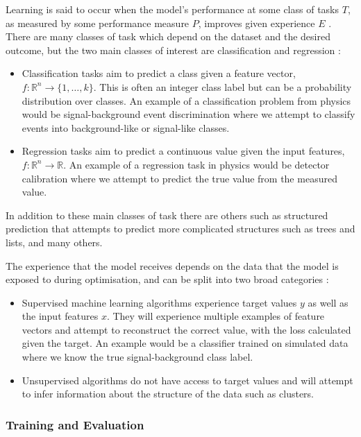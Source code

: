 Learning is said to occur when the model's performance at some class of tasks $T$, as measured by some performance measure $P$, improves given experience $E$ \cite{Learning}.
There are many classes of task which depend on the dataset and the desired outcome, but the two main classes of interest are classification and regression \cite{DeepLearningBook}:
\begin{itemize}[leftmargin=.5in,noitemsep]
    \item Classification tasks aim to predict a class given a feature vector, $f:\mathds{R}^{n}\rightarrow{}\{1,\dots,k\}$.
This is often an integer class label but can be a probability distribution over classes. An example of a classification problem from physics would be signal-background event discrimination where we attempt to classify events into background-like or signal-like classes.
    \item Regression tasks aim to predict a continuous value given the input features, $f:\mathds{R}^{n}\rightarrow\mathds{R}$. An example of a regression task in physics would be detector calibration where we attempt to predict the true value from the measured value. 
\end{itemize}
In addition to these main classes of task there are others such as structured prediction that attempts to predict more complicated structures such as trees and lists, and many others. 


The experience that the model receives depends on the data that the model is exposed to during optimisation, and can be split into two broad categories \cite{DeepLearningBook}:
\begin{itemize}[leftmargin=.5in,noitemsep]
    \item Supervised machine learning algorithms experience target values $y$ as well as the input features $x$. They will experience multiple examples of feature vectors and attempt to reconstruct the correct value, with the loss calculated given the target. An example would be a classifier trained on simulated data where we know the true signal-background class label. 
    \item Unsupervised algorithms do not have access to target values and will attempt to infer information about the structure of the data such as clusters.
\end{itemize}



\subsubsection{Training and Evaluation}

